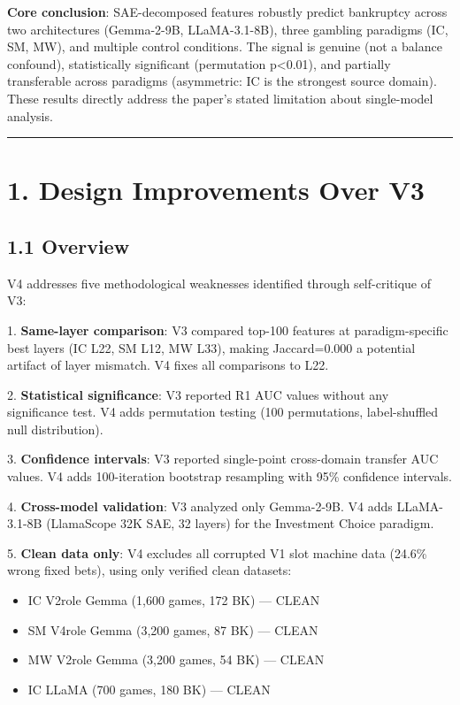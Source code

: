 \documentclass[11pt,a4paper]{article}
\begin{document}
\textbf{Core conclusion}: SAE-decomposed features robustly predict bankruptcy across two architectures (Gemma-2-9B, LLaMA-3.1-8B), three gambling paradigms (IC, SM, MW), and multiple control conditions. The signal is genuine (not a balance confound), statistically significant (permutation p<0.01), and partially transferable across paradigms (asymmetric: IC is the strongest source domain). These results directly address the paper's stated limitation about single-model analysis.

\bigskip\hrule\bigskip

\section{1. Design Improvements Over V3}

\subsection{1.1 Overview}

V4 addresses five methodological weaknesses identified through self-critique of V3:

1. \textbf{Same-layer comparison}: V3 compared top-100 features at paradigm-specific best layers (IC L22, SM L12, MW L33), making Jaccard=0.000 a potential artifact of layer mismatch. V4 fixes all comparisons to L22.

2. \textbf{Statistical significance}: V3 reported R1 AUC values without any significance test. V4 adds permutation testing (100 permutations, label-shuffled null distribution).

3. \textbf{Confidence intervals}: V3 reported single-point cross-domain transfer AUC values. V4 adds 100-iteration bootstrap resampling with 95\% confidence intervals.

4. \textbf{Cross-model validation}: V3 analyzed only Gemma-2-9B. V4 adds LLaMA-3.1-8B (LlamaScope 32K SAE, 32 layers) for the Investment Choice paradigm.

5. \textbf{Clean data only}: V4 excludes all corrupted V1 slot machine data (24.6\% wrong fixed bets), using only verified clean datasets:
\begin{itemize}
\item IC V2role Gemma (1,600 games, 172 BK) — CLEAN
\end{itemize}
\begin{itemize}
\item SM V4role Gemma (3,200 games, 87 BK) — CLEAN
\end{itemize}
\begin{itemize}
\item MW V2role Gemma (3,200 games, 54 BK) — CLEAN
\end{itemize}
\begin{itemize}
\item IC LLaMA (700 games, 180 BK) — CLEAN
\end{itemize}
\end{document}
